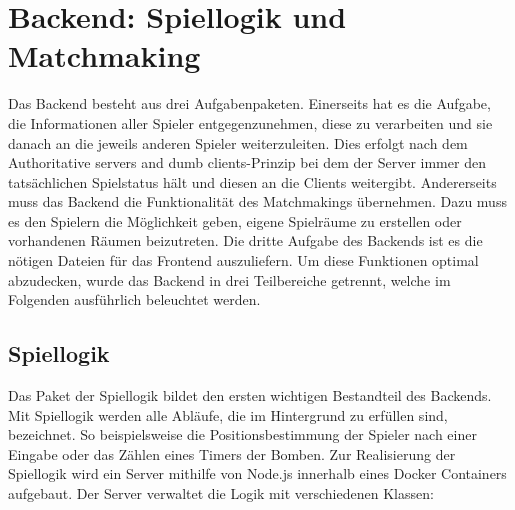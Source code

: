 \documentclass[conference]{IEEEtran}
\begin{document}
\smallskip

\section{Backend: Spiellogik und Matchmaking}
Das Backend besteht aus drei Aufgabenpaketen. Einerseits hat es die Aufgabe, die Informationen aller Spieler entgegenzunehmen, diese zu verarbeiten und sie danach an die jeweils anderen Spieler weiterzuleiten. Dies erfolgt nach dem \glqq Authoritative servers and dumb clients\grqq -Prinzip\cite[p.~189]{html5dev} bei dem der Server immer den tatsächlichen Spielstatus hält und diesen an die Clients weitergibt. Andererseits muss das Backend die Funktionalität des Matchmakings übernehmen. Dazu muss es den Spielern die Möglichkeit geben, eigene Spielräume zu erstellen oder vorhandenen Räumen beizutreten. Die dritte Aufgabe des Backends ist es die nötigen Dateien für das Frontend auszuliefern. Um diese Funktionen optimal abzudecken, wurde das Backend in drei Teilbereiche getrennt, welche im Folgenden ausführlich beleuchtet werden.

\subsection{Spiellogik}
Das Paket der Spiellogik bildet den ersten wichtigen Bestandteil des Backends. Mit Spiellogik werden alle Abläufe, die im Hintergrund zu erfüllen sind, bezeichnet. So beispielsweise die Positionsbestimmung der Spieler nach einer Eingabe oder das Zählen eines Timers der Bomben. Zur Realisierung der Spiellogik wird ein Server mithilfe von Node.js\cite{node} innerhalb eines Docker Containers aufgebaut. Der Server verwaltet die Logik mit verschiedenen Klassen:
\end{document}
